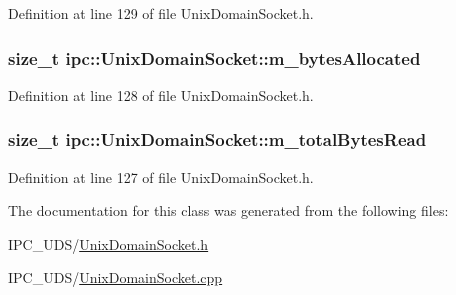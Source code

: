 Definition at line 129 of file Unix\+Domain\+Socket.\+h.

\subsubsection[{\texorpdfstring{m\+\_\+bytes\+Allocated}{m_bytesAllocated}}]{\setlength{\rightskip}{0pt plus 5cm}size\+\_\+t ipc\+::\+Unix\+Domain\+Socket\+::m\+\_\+bytes\+Allocated}\hypertarget{classipc_1_1UnixDomainSocket_a93a554cd7a8c2ef97e22a4e5a28f2191}{}\label{classipc_1_1UnixDomainSocket_a93a554cd7a8c2ef97e22a4e5a28f2191}


Definition at line 128 of file Unix\+Domain\+Socket.\+h.

\subsubsection[{\texorpdfstring{m\+\_\+total\+Bytes\+Read}{m_totalBytesRead}}]{\setlength{\rightskip}{0pt plus 5cm}size\+\_\+t ipc\+::\+Unix\+Domain\+Socket\+::m\+\_\+total\+Bytes\+Read}\hypertarget{classipc_1_1UnixDomainSocket_a2a7e269ee896e8ca6fc4400c28d22f46}{}\label{classipc_1_1UnixDomainSocket_a2a7e269ee896e8ca6fc4400c28d22f46}


Definition at line 127 of file Unix\+Domain\+Socket.\+h.



The documentation for this class was generated from the following files\+:\begin{DoxyCompactItemize}
\item 
I\+P\+C\+\_\+\+U\+D\+S/\hyperlink{UnixDomainSocket_8h}{Unix\+Domain\+Socket.\+h}\item 
I\+P\+C\+\_\+\+U\+D\+S/\hyperlink{UnixDomainSocket_8cpp}{Unix\+Domain\+Socket.\+cpp}\end{DoxyCompactItemize}
